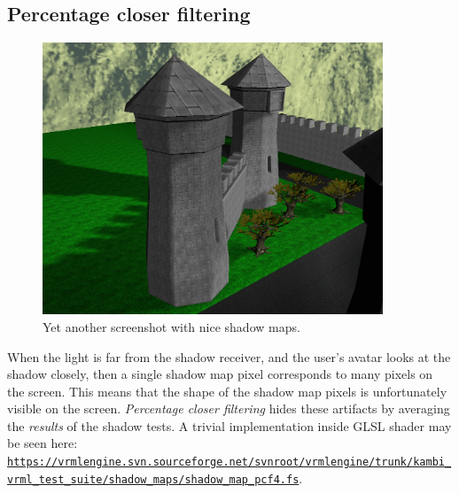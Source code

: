 \documentclass{acmsiggraph}                     %
\newcommand*{\myhref}[2]{\texttt{\href{#1}{\nolinkurl{#2}}}}
\begin{document}
\subsection{Percentage closer filtering}

\begin{figure}[b]
  \centering
  \includegraphics[width=4.0in]{sunny_street_above_view}
  \caption{Yet another screenshot with nice shadow maps.}
\end{figure}

When the light is far from the shadow receiver, and the user's avatar
looks at the shadow closely, then a single shadow map pixel
corresponds to many pixels on the screen. This means that the shape
of the shadow map pixels is unfortunately visible on the screen.
\emph{Percentage closer filtering} \cite{gpugems:pcf} hides these artifacts by
averaging
the \emph{results} of the shadow tests.
A trivial implementation inside GLSL shader may be seen here:
\myhref{https://vrmlengine.svn.sourceforge.net/svnroot/vrmlengine/trunk/kambi\_vrml\_test\_suite/x3d/shadow\_maps/shadow\_map\_pcf4.fs}{https://vrmlengine.svn.sourceforge.net/svnroot/vrmlengine/trunk/kambi_vrml_test_suite/shadow_maps/shadow_map_pcf4.fs}.
\end{document}
